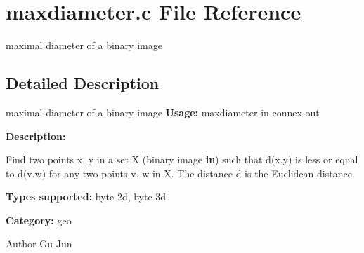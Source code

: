 \section{maxdiameter.c File Reference}
\label{maxdiameter_8c}


maximal diameter of a binary image  




\subsection{Detailed Description}
maximal diameter of a binary image {\bfseries Usage:} maxdiameter in connex out

{\bfseries Description:}

Find two points x, y in a set X (binary image {\bfseries in}) such that d(x,y) is less or equal to d(v,w) for any two points v, w in X. The distance d is the Euclidean distance.

{\bfseries Types supported:} byte 2d, byte 3d

{\bfseries Category:} geo

\begin{DoxyAuthor}{Author}
Gu Jun 
\end{DoxyAuthor}
